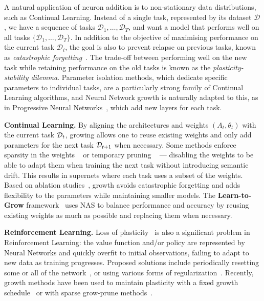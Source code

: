 A natural application of neuron addition is to non-stationary data distributions, such as Continual Learning. Instead of a single task, represented by its dataset $\mathcal{D}$, we have a sequence of tasks $\mathcal{D}_1, \dots, \mathcal{D}_T$, and want a model that performs well on all tasks $\{\mathcal{D}_1, \dots, \mathcal{D}_T\}$. In addition to the objective of maximising performance on the current task $\mathcal{D}_i$, the goal is also to prevent relapse on previous tasks, known as \emph{catastrophic forgetting}~\citep{lange_continual_2021}. The trade-off between performing well on the new task while retaining performance on the old tasks is known as the \emph{plasticity-stability dilemma}. Parameter isolation methods, which dedicate specific parameters to individual tasks, are a particularly strong family of Continual Learning algorithms, and Neural Network growth is naturally adapted to this, as in Progressive Neural Networks~\citep{rusu_progressive_2016}, which add new layers for each task.

\textbf{Continual Learning.} By aligning the architectures and weights $(A_t, \theta_t)$ with the current task $\mathcal{D}_t$, growing allows one to reuse existing weights and only add parameters for the next task $\mathcal{D}_{t+1}$ when necessary. Some methods enforce sparsity in the weights ~\citep{yoon_lifelong_2018,yang_grown_2021} or temporary pruning ~\citep{hung_CPG_2019,wu_firefly_2020} --- disabling the weights to be able to adapt them when training the next task without introducing semantic drift. This results in supernets where each task uses a subset of the weights. Based on ablation studies~\citep{yoon_lifelong_2018}, growth avoids catastrophic forgetting and adds flexibility to the parameters while maintaining smaller models. The \textbf{Learn-to-Grow} framework~\citep{li_learn_2019} uses NAS to balance performance and accuracy by reusing existing weights as much as possible and replacing them when necessary.

\textbf{Reinforcement Learning.} Loss of plasticity~\citep{dohare_loss_2024} is also a significant problem in Reinforcement Learning: the value function and/or policy are represented by Neural Networks and quickly overfit to initial observations, failing to adapt to new data as training progresses. Proposed solutions include periodically resetting some or all of the network~\citep{nikishin_primacy_2022,sokar_dormant_2023}, or using various forms of regularization~\citep{bhatt_crossq_2024,galliciSimplifyingDeepTemporal2025}.
Recently, growth methods have been used to maintain plasticity with a fixed growth schedule~\citep{kangForgetandGrowStrategyDeep2025} or with sparse grow-prune methods~\citep{liu_neuroplastic_2025}.
